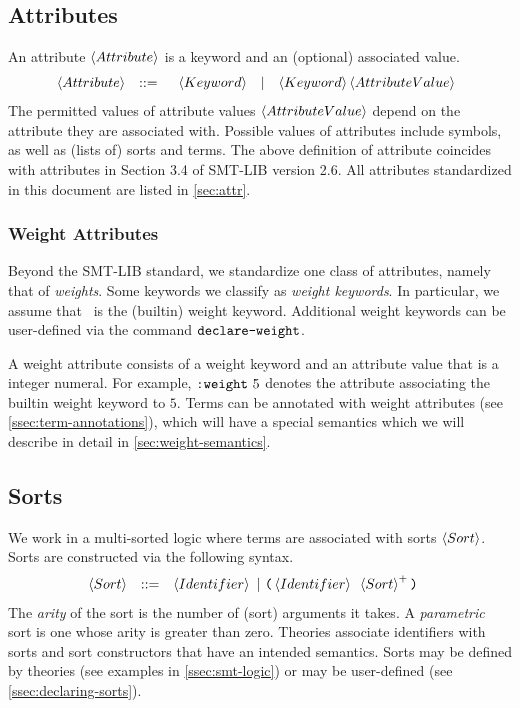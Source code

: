 \documentclass[english,a4paper,10pt]{article}
\begin{document}
\subsection{Attributes}

An attribute $\left\langle Attribute\right\rangle$
is a keyword and an (optional) associated value.
\[
\begin{array}{rcl}
\left\langle Attribute\right\rangle & ::= & \begin{array}{ccc}
\left\langle Keyword\right\rangle & | & \left\langle Keyword\right\rangle \left\langle AttributeValue\right\rangle
\end{array}\\
\end{array}
\]
The permitted values of attribute values $\left\langle AttributeValue\right\rangle$ depend on the attribute
they are associated with.
Possible values of attributes include symbols, as well as (lists of) sorts and terms.
The above definition of attribute coincides with
attributes in Section 3.4 of SMT-LIB version 2.6.
All attributes standardized in this document are listed in \cref{sec:attr}.

\subsubsection{Weight Attributes}
\label{sec:weight-attributes}
Beyond the SMT-LIB standard, we standardize one class of attributes, namely that of \emph{weights}.
Some keywords we classify as \emph{weight keywords}.
In particular, we assume that \kweight\ is the (builtin) weight keyword.
Additional weight keywords can be user-defined via the command $\texttt{declare-weight}$.

A weight attribute consists of a weight keyword and an attribute value that is a integer numeral.
For example, $\texttt{:weight}\mbox{ }5$ denotes the attribute associating the builtin weight keyword to $5$.
Terms can be annotated with weight attributes (see \cref{ssec:term-annotations}),
which will have a special semantics which we will describe in detail in \cref{sec:weight-semantics}.

\subsection{Sorts}

We work in a multi-sorted logic where terms 
are associated with sorts $\left\langle Sort\right\rangle$.
Sorts are constructed via the following syntax.
\begin{alignat*}{1}
 & \begin{array}{rcl}
\left\langle Sort\right\rangle & ::= & \left\langle Identifier\right\rangle\mbox{ }|\mbox{ }\texttt{(}\left\langle Identifier\right\rangle\mbox{ }\left\langle Sort\right\rangle^{+}\texttt{)}\\
\end{array}
\end{alignat*}
The \emph{arity} of the sort is the number of (sort) arguments it takes.
A \emph{parametric} sort is one whose arity is greater than zero.
Theories associate identifiers with sorts and sort constructors
that have an intended semantics.
Sorts may be defined by theories (see examples in \cref{ssec:smt-logic})
or may be user-defined
(see \cref{ssec:declaring-sorts}).
\end{document}
